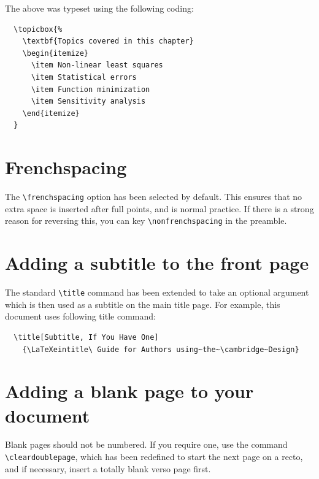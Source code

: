 \noindent The above was typeset using the following coding:
\begin{verbatim}
  \topicbox{%
    \textbf{Topics covered in this chapter}
    \begin{itemize}
      \item Non-linear least squares
      \item Statistical errors
      \item Function minimization
      \item Sensitivity analysis
    \end{itemize}
  }
\end{verbatim}

\section{Frenchspacing}

The \verb"\frenchspacing" option has been selected by default. This ensures that no extra space is inserted after full points, and is normal practice. If there is a strong reason for reversing this, you can key \verb"\nonfrenchspacing" in the preamble.

\section{Adding a subtitle to the front page}

The standard \verb"\title" command has been extended to take an optional argument which is then used as a subtitle on the main title page. For example, this document uses following title command:
\begin{verbatim}
  \title[Subtitle, If You Have One]
    {\LaTeXeintitle\ Guide for Authors using~the~\cambridge~Design}
\end{verbatim}


\section{Adding a blank page to your document}

Blank pages should not be numbered. If you require one, use the command \verb"\cleardoublepage", which has been redefined to start the next page on a recto, and if necessary, insert a totally blank verso page first.


